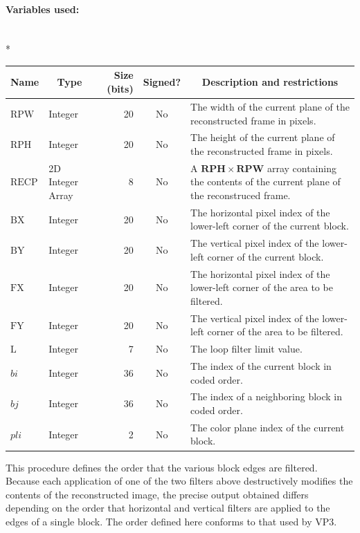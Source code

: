 \documentclass[9pt,letterpaper]{book}
\newcommand{\idx}[1]{{\ensuremath{\mathit{#1}}}}
\newcommand{\pli}{\idx{pli}}
\newcommand{\bi}{\idx{bi}}
\newcommand{\bj}{\idx{bj}}
\newcommand{\bitvar}[1]{\ensuremath{\mathbf{\bm{#1}}}}
\newcommand{\locvar}[1]{\ensuremath{\mathrm{#1}}}
\numberwithin{equation}{chapter}
\numberwithin{figure}{chapter}
\numberwithin{table}{chapter}
\begin{document}
\paragraph{Variables used:}\hfill\\*
\begin{tabularx}{\textwidth}{@{}llrcX@{}}\toprule
\multicolumn{1}{c}{Name} &
\multicolumn{1}{c}{Type} &
\multicolumn{1}{p{30pt}}{\centering Size (bits)} &
\multicolumn{1}{c}{Signed?} &
\multicolumn{1}{c}{Description and restrictions} \\\midrule\endhead
\locvar{RPW}       & Integer & 20 & No  & The width of the current plane of the
 reconstructed frame in pixels. \\
\locvar{RPH}       & Integer & 20 & No  & The height of the current plane of
 the reconstructed frame in pixels. \\
\locvar{RECP}      & \multicolumn{1}{p{50pt}}{2D Integer Array} &
                                8 & No  & A $\bitvar{RPH}\times\bitvar{RPW}$
 array containing the contents of the current plane of the reconstruced
 frame. \\
\locvar{BX}        & Integer & 20 & No  & The horizontal pixel index of the
 lower-left corner of the current block. \\
\locvar{BY}        & Integer & 20 & No  & The vertical pixel index of the
 lower-left corner of the current block. \\
\locvar{FX}        & Integer & 20 & No  & The horizontal pixel index of the
 lower-left corner of the area to be filtered. \\
\locvar{FY}        & Integer & 20 & No  & The vertical pixel index of the
 lower-left corner of the area to be filtered. \\
\locvar{L}         & Integer &  7 & No  & The loop filter limit value. \\
\locvar{\bi}       & Integer & 36 & No  & The index of the current block in
 coded order. \\
\locvar{\bj}       & Integer & 36 & No  & The index of a neighboring block in
 coded order. \\
\locvar{\pli}      & Integer &  2 & No  & The color plane index of the current
 block. \\
\bottomrule\end{tabularx}
\medskip

This procedure defines the order that the various block edges are filtered.
Because each application of one of the two filters above destructively modifies
 the contents of the reconstructed image, the precise output obtained differs
 depending on the order that horizontal and vertical filters are applied to the
 edges of a single block.
The order defined here conforms to that used by VP3.
\end{document}

